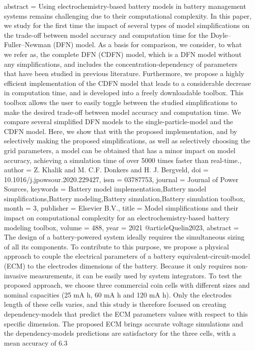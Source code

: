 {{{{{{{   abstract = {Using electrochemistry-based battery models in battery management systems remains challenging due to their computational complexity. In this paper, we study for the first time the impact of several types of model simplifications on the trade-off between model accuracy and computation time for the Doyle–Fuller–Newman (DFN) model. As a basis for comparison, we consider, to what we refer as, the complete DFN (CDFN) model, which is a DFN model without any simplifications, and includes the concentration-dependency of parameters that have been studied in previous literature. Furthermore, we propose a highly efficient implementation of the CDFN model that leads to a considerable decrease in computation time, and is developed into a freely downloadable toolbox. This toolbox allows the user to easily toggle between the studied simplifications to make the desired trade-off between model accuracy and computation time. We compare several simplified DFN models to the single-particle-model and the CDFN model. Here, we show that with the proposed implementation, and by selectively making the proposed simplifications, as well as selectively choosing the grid parameters, a model can be obtained that has a minor impact on model accuracy, achieving a simulation time of over 5000 times faster than real-time.},
   author = {Z. Khalik and M. C.F. Donkers and H. J. Bergveld},
   doi = {10.1016/j.jpowsour.2020.229427},
   issn = {03787753},
   journal = {Journal of Power Sources},
   keywords = {Battery model implementation,Battery model simplifications,Battery modeling,Battery simulation,Battery simulation toolbox},
   month = {3},
   publisher = {Elsevier B.V.},
   title = {Model simplifications and their impact on computational complexity for an electrochemistry-based battery modeling toolbox},
   volume = {488},
   year = {2021}
}
@article{Quelin2023,
   abstract = {The design of a battery-powered system ideally requires the simultaneous sizing of all its components. To contribute to this purpose, we propose a physical approach to couple the electrical parameters of a battery equivalent-circuit-model (ECM) to the electrodes dimensions of the battery. Because it only requires non-invasive measurements, it can be easily used by system integrators. To test the proposed approach, we choose three commercial coin cells with different sizes and nominal capacities (25 mA h, 60 mA h and 120 mA h). Only the electrodes length of these cells varies, and this study is therefore focused on creating dependency-models that predict the ECM parameters values with respect to this specific dimension. The proposed ECM brings accurate voltage simulations and the dependency-models predictions are satisfactory for the three cells, with a mean accuracy of 6.3%
}}}}}}}}
